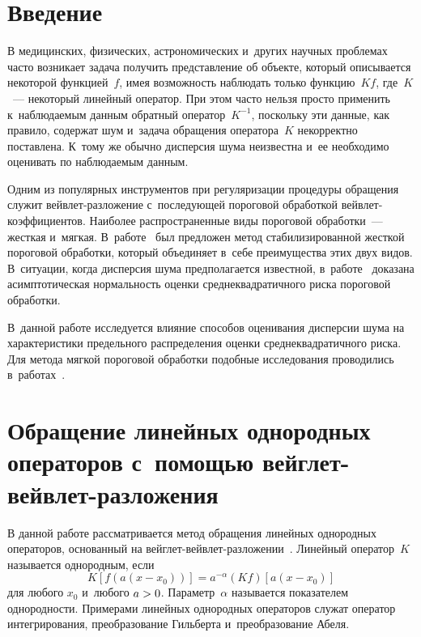   



\thispagestyle{headings}

\begin{multicols}{2}

\label{st\stat}

\section{Введение}

В медицинских, физических, астрономических и~других научных проблемах часто 
возникает задача получить представление об объекте, который описывается 
некоторой функцией~$f$, имея возможность наблюдать только функцию~$Kf$, где~$K$~--- 
некоторый линейный оператор. При этом часто нельзя просто применить 
к~наблюдаемым данным обратный оператор~$K^{-1}$, поскольку эти данные, как правило, 
содержат шум и~задача обращения оператора~$K$ некорректно поставлена. 
К~тому же обычно дис\-пер\-сия шума неизвестна и~ее необходимо оценивать 
по наблюдаемым данным. 

Одним из популярных инструментов при регуляризации 
процедуры обращения служит вейв\-лет-раз\-ло\-же\-ние с~последующей 
пороговой обработкой вейв\-лет-ко\-эф\-фи\-ци\-ен\-тов. Наиболее распростра\-нен\-ные 
виды пороговой обработки~--- жесткая и~мягкая. В~работе~\cite{HL10} 
был предложен метод стабилизированной жесткой пороговой обработки, который 
объединяет в~себе преимущества этих двух видов. 
В~ситуации, когда дисперсия шума предполагается известной, в~работе~\cite{SH18} 
доказана асимптотическая нормальность оценки среднеквадратичного риска пороговой 
обработки. 

В~данной работе исследуется влияние способов оценивания дисперсии шума 
на характеристики предельного распределения оценки среднеквадратичного риска. 
Для метода мягкой пороговой обработки подобные исследования проводились 
в~работах~\cite{KS11-1, KS11-2}.

\section{Обращение линейных однородных операторов с~помощью вейглет-вейвлет-разложения}

В данной работе рассматривается метод обращения линейных однородных операторов, 
основанный на вейг\-лет-вейв\-лет-раз\-ло\-же\-нии~\cite{AS98}. Линейный оператор~$K$ 
называется однородным, если
$$
K\left[f\left(a\left(x-x_0\right)\right)\right]=a^{-\alpha}(Kf)\left[a\left(x-x_0\right)\right]
$$
для любого $x_0$ и~любого $a\hm>0$. Параметр~$\alpha$ называется показателем 
однородности. Примерами линейных однородных операторов служат оператор 
интегрирования, преобразование Гильберта и~преобразование Абеля.


\end{multicols}
